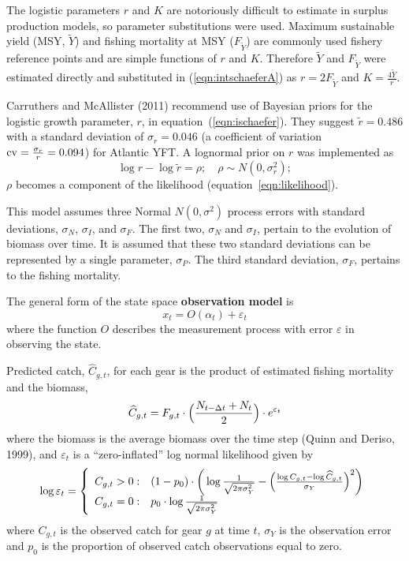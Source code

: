 \documentclass[12pt,letterpaper]{article}
\newcommand\MSY{\widetilde{Y}}
\newcommand\Fmsy{F_{\MSY}}
\begin{document}
The logistic parameters $r$ and $K$ are notoriously difficult to estimate
in surplus production models, 
so parameter substitutions were used. 
Maximum sustainable yield
(MSY, $\MSY$) and fishing mortality at MSY ($\Fmsy$) are commonly used
fishery reference points and are simple functions of $r$ and $K$.
Therefore $\MSY$ and $\Fmsy$ were
estimated directly and substituted in (\ref{eqn:intschaeferA}) as
$r=2\Fmsy$ and $K=\frac{4\MSY}{r}$.

Carruthers and McAllister (2011) recommend use of Bayesian priors for the
logistic growth parameter, $r$, in equation~(\ref{eqn:ischaefer}). They
suggest $\tilde{r} = 0.486$ with a standard deviation of $\sigma_r = 0.046$
(a coefficient of variation ${\rm cv}=\frac{\sigma_r}{r}=0.094$)
for Atlantic YFT.
A lognormal prior on $r$ was implemented as 
\begin{equation}
\log r - \log \tilde{r} = \rho ;\quad \rho\sim N(0,\sigma^2_r);
\end{equation}
$\rho$ becomes a component of the likelihood
(equation~\ref{eqn:likelihood}).

This model assumes three Normal $N(0,\sigma^2)$ process errors with
standard deviations, $\sigma_N$, $\sigma_I$, and $\sigma_F$. The first
two, $\sigma_N$ and $\sigma_I$, pertain to the evolution of biomass over
time. It is assumed that these two standard deviations can be
represented by a single parameter, $\sigma_P$. The third standard
deviation, $\sigma_F$, pertains to the fishing mortality.
\pagebreak[4]

The general form of the state space {\bf observation model} is
\begin{equation}
x_t = O(\alpha_t) + \varepsilon_t
\end{equation}
where the function $O$ describes the measurement process with
error $\varepsilon$ in observing the state.

Predicted catch, $\widehat{C}_{g,t}$, for each gear is the product of
estimated fishing mortality and the biomass,
\begin{equation}
\widehat{C}_{g,t} = F_{g,t}\cdot\Bigl(\frac{N_{t-\Delta
t}+N_t}{2}\Bigr) \cdot e^{\varepsilon_t}
\label{eqn:obs1}
\end{equation}
where the biomass is  the average
biomass over the time step (Quinn and Deriso, 1999), and
$\varepsilon_t$ is a ``zero-inflated'' log normal likelihood given by
\begin{equation}
  \log \varepsilon_t = \left\{
    \begin{array}{r@{\;:\quad}l}
       C_{g,t} > 0 &
(1-p_0)\cdot\bigg(\log\frac{1}{\sqrt{2\pi\sigma^2_Y}}
          -\Bigl(\frac{\log
C_{g,t}-\log\widehat{C}_{g,t}}{\sigma_Y}\Bigr)^2\bigg)\\
       C_{g,t} = 0 & p_0 \cdot\log \frac{1}{\sqrt{2\pi\sigma^2_Y}}\\
    \end{array}
  \right.
\end{equation}
where $C_{g,t}$ is the observed catch for gear $g$ at time $t$,
$\sigma_Y$ is the observation error and
$p_0$ is the proportion of observed catch observations equal to zero.
\end{document}
